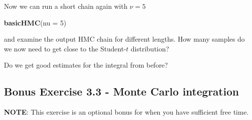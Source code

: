 \documentclass[
]{article}
\newenvironment{Shaded}{\begin{snugshade}}{\end{snugshade}}
\newcommand{\AttributeTok}[1]{\textcolor[rgb]{0.13,0.29,0.53}{#1}}
\newcommand{\CommentTok}[1]{\textcolor[rgb]{0.56,0.35,0.01}{\textit{#1}}}
\newcommand{\ControlFlowTok}[1]{\textcolor[rgb]{0.13,0.29,0.53}{\textbf{#1}}}
\newcommand{\DecValTok}[1]{\textcolor[rgb]{0.00,0.00,0.81}{#1}}
\newcommand{\FunctionTok}[1]{\textcolor[rgb]{0.13,0.29,0.53}{\textbf{#1}}}
\newcommand{\NormalTok}[1]{#1}
\newcommand{\OtherTok}[1]{\textcolor[rgb]{0.56,0.35,0.01}{#1}}
\newcommand{\SpecialCharTok}[1]{\textcolor[rgb]{0.81,0.36,0.00}{\textbf{#1}}}
\begin{document}
\begin{Shaded}
\end{Shaded}

Now we can run a short chain again with \(\nu = 5\)

\begin{Shaded}
\begin{Highlighting}[]
\FunctionTok{basicHMC}\NormalTok{(}\AttributeTok{nu =} \DecValTok{5}\NormalTok{)}
\end{Highlighting}
\end{Shaded}

and examine the output HMC chain for different lengths. How many samples
do we now need to get close to the Student-\(t\) distribution?

Do we get good estimates for the integral from before?

\subsection{Bonus Exercise 3.3 - Monte Carlo
integration}\label{bonus-exercise-3.3---monte-carlo-integration}

\textbf{NOTE}: This exercise is an optional bonus for when you have
sufficient free time.
\end{document}

